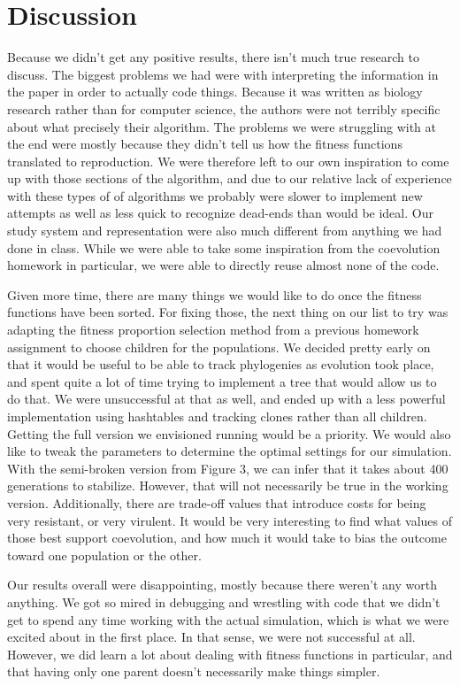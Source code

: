 \documentclass[11pt, oneside]{article}
\begin{document}
\section{Discussion}
Because we didn't get any positive results, there isn't much true research to discuss. The biggest problems we had were with interpreting the information in the paper in order to actually code things. Because it was written as biology research rather than for computer science, the authors were not terribly specific about what precisely their algorithm. The problems we were struggling with at the end were mostly because they didn't tell us how the fitness functions translated to reproduction. We were therefore left to our own inspiration to come up with those sections of the algorithm, and due to our relative lack of experience with these types of of algorithms we probably were slower to implement new attempts as well as less quick to recognize dead-ends than would be ideal. Our study system and representation were also much different from anything we had done in class. While we were able to take some inspiration from the coevolution homework in particular, we were able to directly reuse almost none of the code.

Given more time, there are many things we would like to do once the fitness functions have been sorted. For fixing those, the next thing on our list to try was adapting the fitness proportion selection method from a previous homework assignment to choose children for the populations. We decided pretty early on that it would be useful to be able to track phylogenies as evolution took place, and spent quite a lot of time trying to implement a tree that would allow us to do that. We were unsuccessful at that as well, and ended up with a less powerful implementation using hashtables and tracking clones rather than all children. Getting the full version we envisioned running would be a priority. We would also like to tweak the parameters to determine the optimal settings for our simulation. With the semi-broken version from Figure 3, we can infer that it takes about 400 generations to stabilize. However, that will not necessarily be true in the working version. Additionally, there are trade-off values that introduce costs for being very resistant, or very virulent. It would be very interesting to find what values of those best support coevolution, and how much it would take to bias the outcome toward one population or the other. 

Our results overall were disappointing, mostly because there weren't any worth anything. We got so mired in debugging and wrestling with code that we didn't get to spend any time working with the actual simulation, which is what we were excited about in the first place. In that sense, we were not successful at all. However, we did learn a lot about dealing with fitness functions in particular, and that having only one parent doesn't necessarily make things simpler. 
\end{document}
